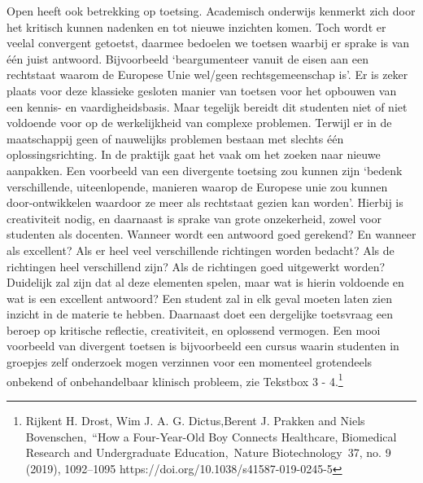 \documentclass[empirical, authordate, ]{new-jote-article}
\begin{document}
	Open heeft ook betrekking op toetsing. Academisch onderwijs kenmerkt zich door het kritisch kunnen nadenken en tot nieuwe inzichten komen. Toch wordt er veelal convergent getoetst, daarmee bedoelen we toetsen waarbij er sprake is van één juist antwoord. Bijvoorbeeld ‘beargumenteer vanuit de eisen aan een rechtstaat waarom de Europese Unie wel/geen rechtsgemeenschap is'. Er is zeker plaats voor deze klassieke gesloten manier van toetsen voor het opbouwen van een kennis- en vaardigheidsbasis. Maar tegelijk bereidt dit studenten niet of niet voldoende voor op de werkelijkheid van complexe problemen. Terwijl er in de maatschappij geen of nauwelijks problemen bestaan met slechts één oplossingsrichting. In de praktijk gaat het vaak om het zoeken naar nieuwe aanpakken. Een voorbeeld van een divergente toetsing zou kunnen zijn ‘bedenk verschillende, uiteenlopende, manieren waarop de Europese unie zou kunnen door-ontwikkelen waardoor ze meer als rechtstaat gezien kan worden'. Hierbij is creativiteit nodig, en daarnaast is sprake van grote onzekerheid, zowel voor studenten als docenten. Wanneer wordt een antwoord goed gerekend? En wanneer als excellent? Als er heel veel verschillende richtingen worden bedacht? Als de richtingen heel verschillend zijn? Als de richtingen goed uitgewerkt worden? Duidelijk zal zijn dat al deze elementen spelen, maar wat is hierin voldoende en wat is een excellent antwoord? Een student zal in elk geval moeten laten zien inzicht in de materie te hebben. Daarnaast doet een dergelijke toetsvraag een beroep op kritische reflectie, creativiteit, en oplossend vermogen. Een mooi voorbeeld van divergent toetsen is bijvoorbeeld een cursus waarin studenten in groepjes zelf onderzoek mogen verzinnen voor een momenteel grotendeels onbekend of onbehandelbaar klinisch probleem, zie Tekstbox 3 - 4.\footnote{Rijkent H. Drost, Wim J. A. G. Dictus,Berent J. Prakken and Niels Bovenschen, “How a Four-Year-Old Boy Connects Healthcare, Biomedical Research and Undergraduate Education, Nature Biotechnology 37, no. 9 (2019), 1092--1095 https://doi.org/10.1038/s41587-019-0245-5}
\end{document}

